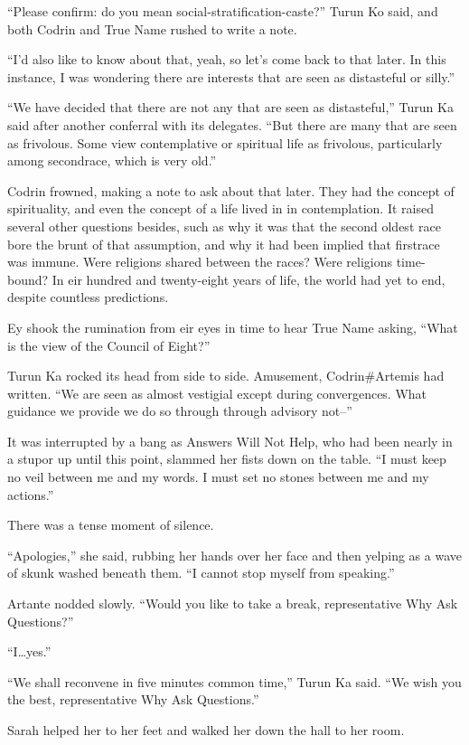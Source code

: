 ``Please confirm: do you mean social-stratification-caste?'' Turun Ko said, and both Codrin and True Name rushed to write a note.

``I'd also like to know about that, yeah, so let's come back to that later. In this instance, I was wondering there are interests that are seen as distasteful or silly.''

``We have decided that there are not any that are seen as distasteful,'' Turun Ka said after another conferral with its delegates. ``But there are many that are seen as frivolous. Some view contemplative or spiritual life as frivolous, particularly among secondrace, which is very old.''

Codrin frowned, making a note to ask about that later. They had the concept of spirituality, and even the concept of a life lived in in contemplation. It raised several other questions besides, such as why it was that the second oldest race bore the brunt of that assumption, and why it had been implied that firstrace was immune. Were religions shared between the races? Were religions time-bound? In eir hundred and twenty-eight years of life, the world had yet to end, despite countless predictions.

Ey shook the rumination from eir eyes in time to hear True Name asking, ``What is the view of the Council of Eight?''

Turun Ka rocked its head from side to side. Amusement, Codrin\#Artemis had written. ``We are seen as almost vestigial except during convergences. What guidance we provide we do so through through advisory not--''

It was interrupted by a bang as Answers Will Not Help, who had been nearly in a stupor up until this point, slammed her fists down on the table. ``I must keep no veil between me and my words. I must set no stones between me and my actions.''

There was a tense moment of silence.

``Apologies,'' she said, rubbing her hands over her face and then yelping as a wave of skunk washed beneath them. ``I cannot stop myself from speaking.''

Artante nodded slowly. ``Would you like to take a break, representative Why Ask Questions?''

``I\ldots yes.''

``We shall reconvene in five minutes common time,'' Turun Ka said. ``We wish you the best, representative Why Ask Questions.''

Sarah helped her to her feet and walked her down the hall to her room.

